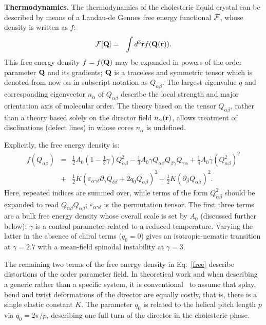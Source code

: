 \documentclass[12pt]{article}
\begin{document}
\medskip
\noindent
\textbf{Thermodynamics.}
The thermodynamics of the cholesteric liquid crystal can be described
by means of a  Landau-de Gennes free energy functional $\cal F$,
whose density is written as $f$:
\begin{eqnarray}
{\cal F}[{\bf Q}]&=&\int d^3{\bf r} f({\bf Q}({\bf r})).
\end{eqnarray}
This free energy density $f = f({\bf Q})$ may be expanded in powers of the
order parameter ${\bf Q}$ and its gradients; ${\bf Q}$ is a traceless 
and symmetric tensor which is denoted from now on in subscript
notation as $Q_{\alpha\beta}$.
The largest eigenvalue $q$ and corresponding eigenvector $n_\alpha$
of $Q_{\alpha\beta}$ describe the local strength and major orientation axis
of molecular order.
The theory based on the tensor $Q_{\alpha\beta}$, rather than a theory based
solely
on the director field $n_\alpha ({\bf r})$, allows treatment of disclinations
(defect lines) in whose cores $n_\alpha$ is undefined.

Explicitly, the free energy density is:
\begin{eqnarray}
f(Q_{\alpha\beta}) &=& {\textstyle \frac{1}{2}} A_0
 \left(1- {\textstyle \frac{1}{3}}\gamma \right)Q^2_{\alpha \beta}
-{\textstyle \frac{1}{3}}A_0\gamma Q_{\alpha \beta} Q_{\beta \gamma}Q_{\gamma \alpha} 
+ {\textstyle \frac{1}{4}} A_0\gamma (Q^2_{\alpha \beta})^2  \nonumber\\
&+& {\textstyle \frac{1}{2}} K(\varepsilon_{\alpha \gamma \delta}
\partial_\gamma Q_{\delta \beta} + 2 q_0 Q_{\alpha \beta})^2
+ {\textstyle \frac{1}{2}} K (\partial_\beta Q_{\alpha \beta})^2.
\label{free}
\end{eqnarray}
Here, repeated indices are summed over, while terms of the form
$Q^2_{\alpha\beta}$ should be expanded to read $Q_{\alpha\beta}Q_{\alpha\beta}$;
$\varepsilon_{\alpha\gamma\delta}$ is the permutation tensor.
The first three terms are a bulk free energy density whose overall scale
is set by $A_0$ (discussed further below); $\gamma$ is a control parameter
related to a reduced temperature. Varying the latter in the absence of
chiral terms ($q_0=0$) gives an isotropic-nematic transition at
$\gamma = 2.7$ with a mean-field spinodal instability at $\gamma = 3$.

The remaining two terms of the free energy density in Eq.~\ref{free} describe
distortions of the order parameter field. In theoretical work and when
describing a generic rather than a specific system, it is 
conventional~\cite{mermin,deGennes} to
assume that splay, bend and twist deformations of the director are equally
costly, that is, there is a single elastic constant $K$. The parameter $q_0$
is related to the helical pitch length $p$ via $q_0=2\pi/p$,
describing one full turn of the director in the cholesteric phase.
\end{document}
